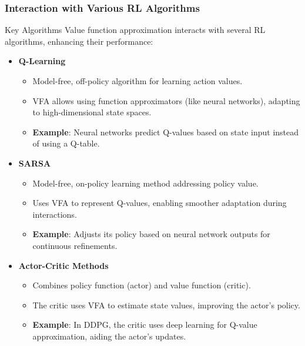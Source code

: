 \documentclass[aspectratio=169]{beamer}
\begin{document}
\begin{frame}[fragile]
    \frametitle{Interaction with Various RL Algorithms}
    \begin{block}{Key Algorithms}
        Value function approximation interacts with several RL algorithms, enhancing their performance:
        \begin{itemize}
            \item \textbf{Q-Learning}
                \begin{itemize}
                    \item Model-free, off-policy algorithm for learning action values.
                    \item VFA allows using function approximators (like neural networks), adapting to high-dimensional state spaces.
                    \item \textbf{Example}: Neural networks predict Q-values based on state input instead of using a Q-table.
                \end{itemize}
                
            \item \textbf{SARSA}
                \begin{itemize}
                    \item Model-free, on-policy learning method addressing policy value.
                    \item Uses VFA to represent Q-values, enabling smoother adaptation during interactions.
                    \item \textbf{Example}: Adjusts its policy based on neural network outputs for continuous refinements.
                \end{itemize}

            \item \textbf{Actor-Critic Methods}
                \begin{itemize}
                    \item Combines policy function (actor) and value function (critic).
                    \item The critic uses VFA to estimate state values, improving the actor's policy.
                    \item \textbf{Example}: In DDPG, the critic uses deep learning for Q-value approximation, aiding the actor’s updates.
                \end{itemize}
        \end{itemize}
    \end{block}
\end{frame}
\end{document}

